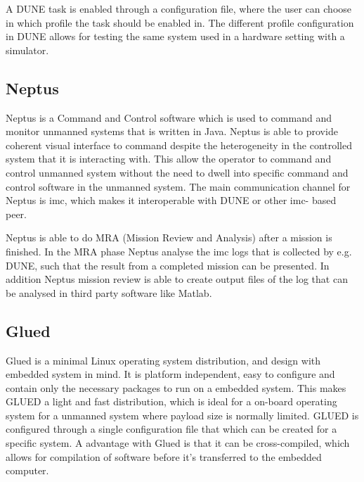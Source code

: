 A DUNE task is enabled through a configuration file, where the user can choose in which profile the task should be enabled in. The different profile configuration in DUNE allows for testing the same system used in a hardware setting with a simulator.
\subsection{Neptus}
Neptus is a Command and Control software which is used to command and monitor unmanned systems that is written in Java. Neptus is able to provide coherent visual interface to command despite the heterogeneity in the controlled system that it is interacting with.  This allow the operator to command and control unmanned system without the need to dwell into specific command and control software in the unmanned system. The main communication channel for Neptus is \gls{imc}, which makes it interoperable with DUNE or other \gls{imc}- based peer.

Neptus is able to do MRA (Mission Review and Analysis) after a mission is finished. In the MRA phase Neptus analyse the \gls{imc} logs that is collected by e.g. DUNE, such that the result from a completed mission can be presented. In addition Neptus mission review is able to create output files of the log that can be analysed in third party software like Matlab.
\subsection{Glued}
Glued is a minimal Linux operating system distribution, and design with embedded system in mind. It is platform independent, easy to configure and contain only the necessary packages to run on a embedded system. This makes GLUED a light and fast distribution, which is ideal for a on-board operating system for a unmanned system where payload size is normally limited. GLUED is configured through a single configuration file that which can be created for a specific system. A advantage with Glued is that it can be cross-compiled, which allows for compilation of software before it's transferred to the embedded computer.
